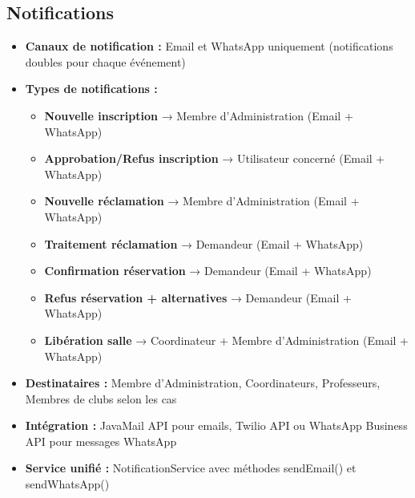 \documentclass[12pt,a4paper]{article}
\begin{document}
\subsection{Notifications}
\begin{itemize}
    \item \textbf{Canaux de notification :} Email et WhatsApp uniquement (notifications doubles pour chaque événement)
    \item \textbf{Types de notifications :}
    \begin{itemize}
        \item \textbf{Nouvelle inscription} → Membre d'Administration (Email + WhatsApp)
        \item \textbf{Approbation/Refus inscription} → Utilisateur concerné (Email + WhatsApp)
        \item \textbf{Nouvelle réclamation} → Membre d'Administration (Email + WhatsApp)
        \item \textbf{Traitement réclamation} → Demandeur (Email + WhatsApp)
        \item \textbf{Confirmation réservation} → Demandeur (Email + WhatsApp)
        \item \textbf{Refus réservation + alternatives} → Demandeur (Email + WhatsApp)
        \item \textbf{Libération salle} → Coordinateur + Membre d'Administration (Email + WhatsApp)
    \end{itemize}
    \item \textbf{Destinataires :} Membre d'Administration, Coordinateurs, Professeurs, Membres de clubs selon les cas
    \item \textbf{Intégration :} JavaMail API pour emails, Twilio API ou WhatsApp Business API pour messages WhatsApp
    \item \textbf{Service unifié :} NotificationService avec méthodes sendEmail() et sendWhatsApp()
\end{itemize}
\end{document}
